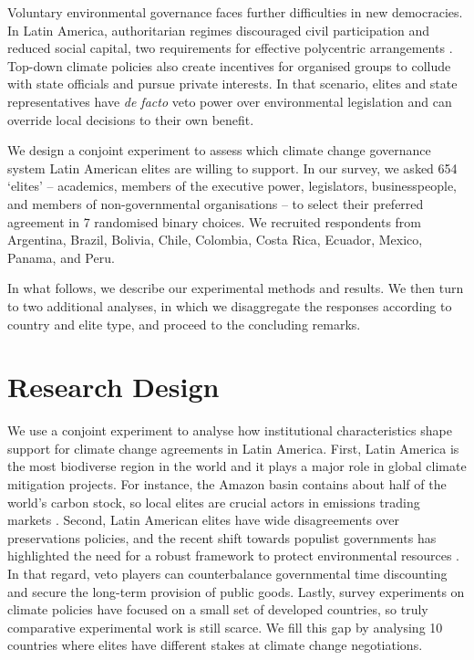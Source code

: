 \documentclass[a4paper,12pt]{article}
\begin{document}
Voluntary environmental governance faces further difficulties in new democracies. In Latin America, authoritarian regimes discouraged civil participation and reduced social capital, two requirements for effective polycentric arrangements \citep{aligica2014institutional,ostrom1990governing}. Top-down climate policies also create incentives for organised groups to collude with state officials and pursue private interests. In that scenario, elites and state representatives have \textit{de facto} veto power over environmental legislation and can override local decisions to their own benefit.

We design a conjoint experiment to assess which climate change governance system Latin American elites are willing to support. In our survey, we asked 654 `elites' -- academics, members of the executive power, legislators, businesspeople, and members of non-governmental organisations -- to select their preferred agreement in 7 randomised binary choices. We recruited respondents from Argentina, Brazil, Bolivia, Chile, Colombia, Costa Rica, Ecuador, Mexico, Panama, and Peru.

In what follows, we describe our experimental methods and results. We then turn to two additional analyses, in which we disaggregate the responses according to country and elite type, and proceed to the concluding remarks.

\section{Research Design}%
\label{sec:research_design}

We use a conjoint experiment to analyse how institutional characteristics shape support for climate change agreements in Latin America. First, Latin America is the most biodiverse region in the world and it plays a major role in global climate mitigation projects. For instance, the Amazon basin contains about half of the world's carbon stock, so local elites are crucial actors in emissions trading markets \citep{yang2018post}. Second, Latin American elites have wide disagreements over preservations policies, and the recent shift towards populist governments has highlighted the need for a robust framework to protect environmental resources \citep{ellner2019pinktide}. In that regard, veto players can counterbalance governmental time discounting and secure the long-term provision of public goods. Lastly, survey experiments on climate policies have focused on a small set of developed countries, so truly comparative experimental work is still scarce. We fill this gap by analysing 10 countries where elites have different stakes at climate change negotiations.  
\end{document}
